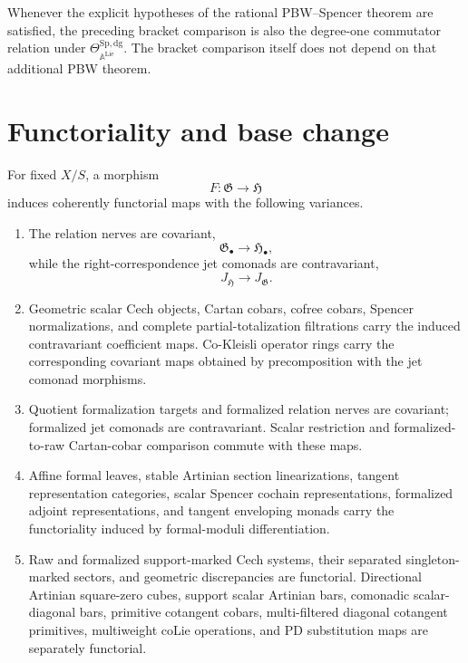 \begin{remark}
Whenever the explicit hypotheses of the rational PBW--Spencer theorem are
satisfied, the preceding bracket comparison is also the degree-one
commutator relation under
$\Theta_{\mathbb A^{\mathrm{Lie}}}^{\mathrm{Sp,dg}}$.  The bracket comparison
itself does not depend on that additional PBW theorem.
\end{remark}

\section{Functoriality and base change}
\label{sec:as-functoriality}

\begin{theorem}
\label{thm:as-fixed-object-functoriality}
For fixed $X/S$, a morphism
\[
    F:\mathfrak G\longrightarrow\mathfrak H
\]
induces coherently functorial maps with the following variances.
\begin{enumerate}
    \item The relation nerves are covariant,
    \[
        \mathfrak G_\bullet\longrightarrow\mathfrak H_\bullet,
    \]
    while the right-correspondence jet comonads are contravariant,
    \[
        J_{\mathfrak H}\longrightarrow J_{\mathfrak G}.
    \]

    \item Geometric scalar Cech objects, Cartan cobars, cofree cobars, Spencer
    normalizations, and complete partial-totalization filtrations carry the
    induced contravariant coefficient maps.  Co-Kleisli operator rings carry
    the corresponding covariant maps obtained by precomposition with the jet
    comonad morphisms.

    \item Quotient formalization targets and formalized relation nerves are
    covariant; formalized jet comonads are contravariant.  Scalar restriction
    and formalized-to-raw Cartan-cobar comparison commute with these maps.

    \item Affine formal leaves, stable Artinian section linearizations,
    tangent representation categories, scalar Spencer cochain
    representations, formalized adjoint representations, and tangent
    enveloping monads carry the functoriality induced by formal-moduli
    differentiation.

    \item Raw and formalized support-marked Cech systems, their separated
    singleton-marked sectors, and geometric discrepancies are functorial.
    Directional Artinian square-zero cubes, support scalar Artinian bars,
    comonadic scalar-diagonal bars, primitive cotangent cobars, multi-filtered
    diagonal cotangent primitives, multiweight coLie operations, and PD
    substitution maps are separately functorial.


\end{enumerate}
\end{theorem}
